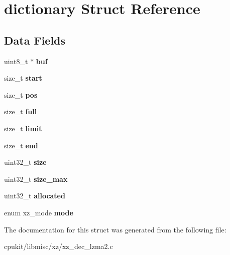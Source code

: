 \hypertarget{structdictionary}{}\section{dictionary Struct Reference}
\label{structdictionary}
\subsection*{Data Fields}
\begin{DoxyCompactItemize}
\item 
\mbox{\label{structdictionary_a9325224710095ab7eeb96cb6dc3e8c72}} 
uint8\+\_\+t $\ast$ {\bfseries buf}
\item 
\mbox{\label{structdictionary_a259520e4ef92a301f261b6fbdfd05d4d}} 
size\+\_\+t {\bfseries start}
\item 
\mbox{\label{structdictionary_adfad306c886477a4282f5fe6fc259134}} 
size\+\_\+t {\bfseries pos}
\item 
\mbox{\label{structdictionary_a2a6267013b7a1ff0633faef1cfd53b57}} 
size\+\_\+t {\bfseries full}
\item 
\mbox{\label{structdictionary_ac62dd33fb8817c9653cb6d73acc5f3c6}} 
size\+\_\+t {\bfseries limit}
\item 
\mbox{\label{structdictionary_a22c69217d567253eca98655576fa8f24}} 
size\+\_\+t {\bfseries end}
\item 
\mbox{\label{structdictionary_a0e02995ea56bd83cb87f8b889bfc2ef4}} 
uint32\+\_\+t {\bfseries size}
\item 
\mbox{\label{structdictionary_ad425f59b4e99e8abf750fe0521e7936f}} 
uint32\+\_\+t {\bfseries size\+\_\+max}
\item 
\mbox{\label{structdictionary_a745100170787e071fea51eac1419d789}} 
uint32\+\_\+t {\bfseries allocated}
\item 
\mbox{\label{structdictionary_a7da6afcdd8a4e9a2a07eb9cf9c9a6344}} 
enum xz\+\_\+mode {\bfseries mode}
\end{DoxyCompactItemize}


The documentation for this struct was generated from the following file\+:\begin{DoxyCompactItemize}
\item 
cpukit/libmisc/xz/xz\+\_\+dec\+\_\+lzma2.\+c\end{DoxyCompactItemize}
